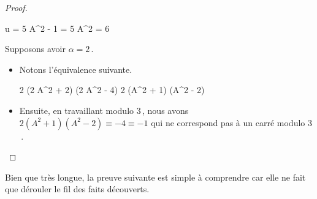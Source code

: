 \begin{proof}
\begin{itemize}
        \medskip
        \noindent\kern-6pt%
        \begin{stepcalc}[style=ar*, ope=\iff]
        	u = 5
    	\explnext{}
        	A^2 - 1 = 5
        	A^2 = 6
        \end{stepcalc}
    \end{itemize}
    
    \medskip
    
    Supposons avoir $\alpha = 2$\,.
    
    \begin{itemize}
    	\item Notons l'équivalence suivante.
        
        \medskip
        \noindent\kern-6pt%
        \begin{stepcalc}[style=ar*, ope=\iff]
        	2 (2 A^2 + 2) (2 A^2 - 4) \in \NNssquare
        	2 (A^2 + 1) (A^2 - 2) \in \NNssquare
        \end{stepcalc}

		\item Ensuite, en travaillant modulo $3$\,, nous avons
		$2 (A^2 + 1) (A^2 - 2) \equiv -4 \equiv -1$ qui ne correspond pas à un carré modulo $3$\,.
		\qedhere 
    \end{itemize}   
\end{proof}





Bien que très longue, la preuve suivante est simple à comprendre car elle ne fait que dérouler le fil des faits découverts.

